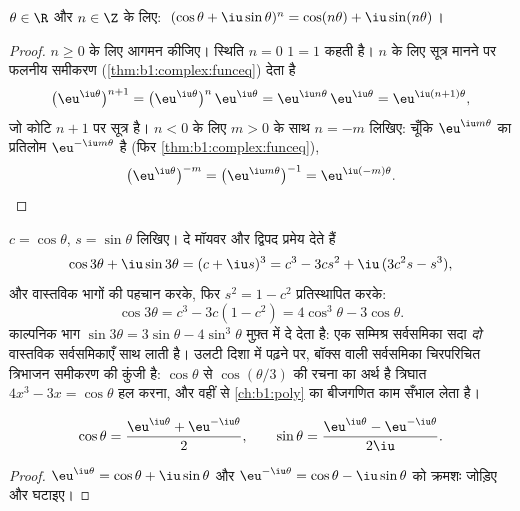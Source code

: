 \begin{corollary}[दे मॉयवर का सूत्र]\label{cor:b1:complex:demoivre}
$\theta \in \R$ और $n \in \Z$ के लिए: $\;(\cos\theta + \iu\sin\theta)^n =
\cos(n\theta) + \iu\sin(n\theta)$।
\end{corollary}

\begin{proof}
$n \geq 0$ के लिए आगमन कीजिए। स्थिति $n = 0$ $1 = 1$ कहती है। $n$ के लिए
सूत्र मानने पर फलनीय समीकरण (\cref{thm:b1:complex:funceq}) देता है
\[
\bigl(\eu^{\iu\theta}\bigr)^{n+1}
= \bigl(\eu^{\iu\theta}\bigr)^{n}\,\eu^{\iu\theta}
= \eu^{\iu n\theta}\,\eu^{\iu\theta}
= \eu^{\iu(n+1)\theta} ,
\]
जो कोटि $n + 1$ पर सूत्र है। $n < 0$ के लिए $m > 0$ के साथ $n = -m$ लिखिए:
चूँकि $\eu^{\iu m\theta}$ का प्रतिलोम $\eu^{-\iu m\theta}$ है (फिर
\cref{thm:b1:complex:funceq}),
\[
\bigl(\eu^{\iu\theta}\bigr)^{-m}
= \bigl(\eu^{\iu m\theta}\bigr)^{-1}
= \eu^{\iu(-m)\theta} . \qedhere
\]
\end{proof}

\begin{example}\label{ex:b1:complex:cos3}
$c = \cos\theta$, $s = \sin\theta$ लिखिए। दे मॉयवर और द्विपद प्रमेय देते हैं
\[
\cos 3\theta + \iu \sin 3\theta = (c + \iu s)^3
= c^3 - 3cs^2 + \iu\,(3c^2 s - s^3),
\]
और वास्तविक भागों की पहचान करके, फिर $s^2 = 1 - c^2$ प्रतिस्थापित करके:
\[
\cos 3\theta = c^3 - 3c(1 - c^2) = 4\cos^3\theta - 3\cos\theta .
\]
काल्पनिक भाग $\sin 3\theta = 3\sin\theta - 4\sin^3\theta$ मुफ़्त में दे देता
है: एक सम्मिश्र सर्वसमिका सदा \emph{दो} वास्तविक सर्वसमिकाएँ साथ लाती है।
उलटी दिशा में पढ़ने पर, बॉक्स वाली सर्वसमिका चिरपरिचित त्रिभाजन समीकरण की
कुंजी है: $\cos\theta$ से $\cos(\theta/3)$ की रचना का अर्थ है त्रिघात $4x^3
- 3x = \cos\theta$ हल करना, और वहीं से \cref{ch:b1:poly} का बीजगणित काम
सँभाल लेता है।
\end{example}

\begin{proposition}[ऑयलर के सूत्र]\label{prop:b1:complex:euler}
\[
\cos\theta = \frac{\eu^{\iu\theta} + \eu^{-\iu\theta}}{2},
\qquad
\sin\theta = \frac{\eu^{\iu\theta} - \eu^{-\iu\theta}}{2\iu}.
\]
\end{proposition}

\begin{proof}
$\eu^{\iu\theta} = \cos\theta + \iu\sin\theta$ और $\eu^{-\iu\theta} =
\cos\theta - \iu\sin\theta$ को क्रमशः जोड़िए और घटाइए।
\end{proof}

